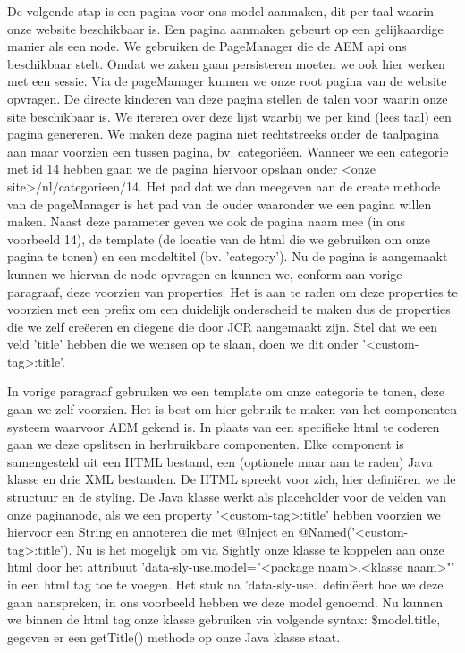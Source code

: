 \documentclass{article}
\begin{document}
	De volgende stap is een pagina voor ons model aanmaken, dit per taal waarin onze website beschikbaar is. Een pagina aanmaken gebeurt op een gelijkaardige manier als een node. We gebruiken de PageManager die de AEM api ons beschikbaar stelt. Omdat we zaken gaan persisteren moeten we ook hier werken met een sessie. Via de pageManager kunnen we onze root pagina van de website opvragen. De directe kinderen van deze pagina stellen de talen voor waarin onze site beschikbaar is. We itereren over deze lijst waarbij we per kind (lees taal) een pagina genereren. We maken deze pagina niet rechtstreeks onder de taalpagina aan maar voorzien een tussen pagina, bv. categoriëen. Wanneer we een categorie met id 14 hebben gaan we de pagina hiervoor opslaan onder <onze site>/nl/categorieen/14. Het pad dat we dan meegeven aan de create methode van de pageManager is het pad van de ouder waaronder we een pagina willen maken. Naast deze parameter geven we ook de pagina naam mee (in ons voorbeeld 14), de template (de locatie van de html die we gebruiken om onze pagina te tonen) en een modeltitel (bv. 'category'). Nu de pagina is aangemaakt kunnen we hiervan de node opvragen en kunnen we, conform aan vorige paragraaf, deze voorzien van properties. Het is aan te raden om deze properties te voorzien met een prefix om een duidelijk onderscheid te maken dus de properties die we zelf creëeren en diegene die door JCR aangemaakt zijn. Stel dat we een veld 'title' hebben die we wensen op te slaan, doen we dit onder '<custom-tag>:title'.
    \par
    In vorige paragraaf gebruiken we een template om onze categorie te tonen, deze gaan we zelf voorzien. Het is best om hier gebruik te maken van het componenten systeem waarvoor AEM gekend is. In plaats van een specifieke html te coderen gaan we deze opslitsen in herbruikbare componenten. Elke component is samengesteld uit een HTML bestand, een (optionele maar aan te raden) Java klasse en drie XML bestanden. De HTML spreekt voor zich, hier definiëren we de structuur en de styling. De Java klasse werkt als placeholder voor de velden van onze paginanode, als we een property '<custom-tag>:title' hebben voorzien we hiervoor een String en annoteren die met @Inject en @Named('<custom-tag>:title'). Nu is het mogelijk om via Sightly onze klasse te koppelen aan onze html door het attribuut 'data-sly-use.model="<package naam>.<klasse naam>"' in een html tag toe te voegen. Het stuk na 'data-sly-use.' definiëert hoe we deze gaan aanspreken, in ons voorbeeld hebben we deze model genoemd. Nu kunnen we binnen de html tag onze klasse gebruiken via volgende syntax: \${model.title}, gegeven er een getTitle() methode op onze Java klasse staat.
\end{document}
